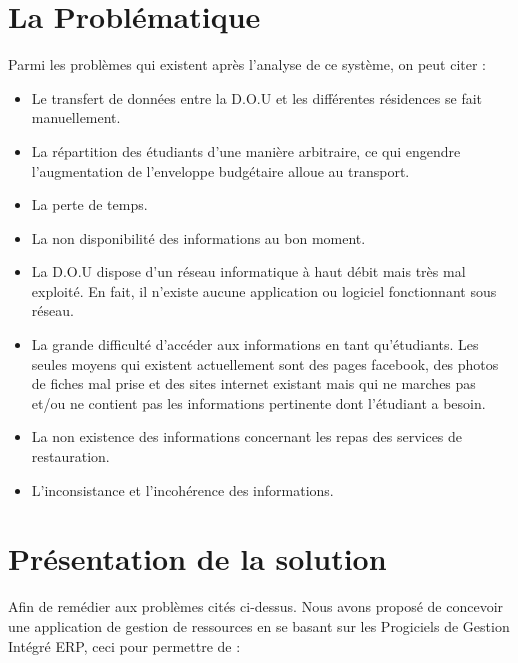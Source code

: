 \section{La Problématique}
Parmi les problèmes qui existent après l’analyse de ce système, on peut citer :
\begin{itemize}
    \item Le transfert de données entre la \acs{D.O.U} et les différentes résidences se fait manuellement.
    \item La répartition des étudiants d’une manière arbitraire, ce qui engendre l’augmentation de l’enveloppe budgétaire alloue au transport.
    \item La perte de temps.
    \item La non disponibilité des informations au bon moment.
    \item La \acs{D.O.U} dispose d'un réseau informatique à haut débit mais très mal exploité. En fait, il n'existe aucune application ou logiciel fonctionnant sous réseau.
    \item La grande difficulté d'accéder aux informations en tant qu'étudiants. Les seules moyens qui existent actuellement sont des pages facebook, des photos de fiches mal prise et des sites internet existant mais qui ne marches pas et/ou ne contient pas les informations pertinente dont l'étudiant a besoin.
    \item La non existence des informations concernant les repas des services de restauration.
    \item L'inconsistance et l'incohérence des informations.\\
\end{itemize}

\section{Présentation de la solution}
Afin de remédier aux problèmes cités ci-dessus. Nous avons proposé de concevoir une application de gestion de ressources en se basant sur les Progiciels de Gestion Intégré \acs{ERP}, ceci pour permettre de :\\

